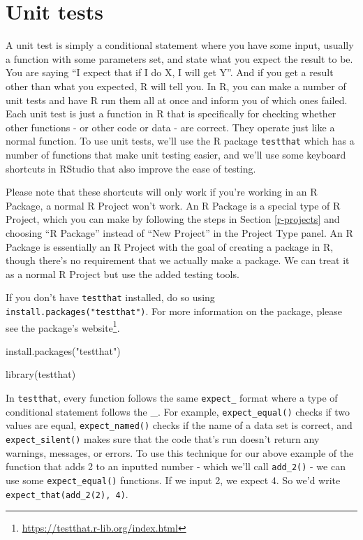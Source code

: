 \documentclass[
]{krantz}
\makeatletter
\newenvironment{Shaded}{\begin{snugshade}}{\end{snugshade}}
\newcommand{\FunctionTok}[1]{\textcolor[rgb]{0,0,0}{#1}}
\newcommand{\NormalTok}[1]{#1}
\newcommand{\StringTok}[1]{\textcolor[rgb]{0.5,0.5,0.5}{#1}}
\renewcommand{\href}[2]{#2\footnote{\url{#1}}}
\newenvironment{kframe}{%
\medskip{}
\setlength{\fboxsep}{.8em}
 \def\at@end@of@kframe{}%
 \ifinner\ifhmode%
  \def\at@end@of@kframe{\end{minipage}}%
  \begin{minipage}{\columnwidth}%
 \fi\fi%
 \def\FrameCommand##1{\hskip\@totalleftmargin \hskip-\fboxsep
 \colorbox{shadecolor}{##1}\hskip-\fboxsep
     \hskip-\linewidth \hskip-\@totalleftmargin \hskip\columnwidth}%
 \MakeFramed {\advance\hsize-\width
   \@totalleftmargin\z@ \linewidth\hsize
   \@setminipage}}%
 {\par\unskip\endMakeFramed%
 \at@end@of@kframe}
\renewenvironment{Shaded}{\begin{kframe}}{\end{kframe}}
\makeatother
\begin{document}
\hypertarget{unit-tests}{%
\section{Unit tests}\label{unit-tests}}

A unit test is simply a conditional statement where you have
some input, usually a function with some parameters set, and
state what you expect the result to be. You are saying ``I
expect that if I do X, I will get Y''. And if you get a
result other than what you expected, R will tell you. In R,
you can make a number of unit tests and have R run them all
at once and inform you of which ones failed. Each unit test
is just a function in R that is specifically for checking
whether other functions - or other code or data - are
correct. They operate just like a normal function. To use
unit tests, we'll use the R package \texttt{testthat} which
has a number of functions that make unit testing easier, and
we'll use some keyboard shortcuts in RStudio that also
improve the ease of testing.

Please note that these shortcuts will only work if you're
working in an R Package, a normal R Project won't work. An R
Package is a special type of R Project, which you can make
by following the steps in Section \ref{r-projects} and
choosing ``R Package'' instead of ``New Project'' in the
Project Type panel. An R Package is essentially an R Project
with the goal of creating a package in R, though there's no
requirement that we actually make a package. We can treat it
as a normal R Project but use the added testing tools.

If you don't have \texttt{testthat} installed, do so using
\texttt{install.packages("testthat")}. For more information
on the package, please see the package's
\href{https://testthat.r-lib.org/index.html}{website}.

\begin{Shaded}
\begin{Highlighting}[]
\FunctionTok{install.packages}\NormalTok{(}\StringTok{"testthat"}\NormalTok{)}
\end{Highlighting}
\end{Shaded}

\begin{Shaded}
\begin{Highlighting}[]
\FunctionTok{library}\NormalTok{(testthat)}
\end{Highlighting}
\end{Shaded}

In \texttt{testthat}, every function follows the same
\texttt{expect\_} format where a type of conditional
statement follows the \_. For example,
\texttt{expect\_equal()} checks if two values are equal,
\texttt{expect\_named()} checks if the name of a data set is
correct, and \texttt{expect\_silent()} makes sure that the
code that's run doesn't return any warnings, messages, or
errors. To use this technique for our above example of the
function that adds 2 to an inputted number - which we'll
call \texttt{add\_2()} - we can use some
\texttt{expect\_equal()} functions. If we input 2, we expect
4. So we'd write \texttt{expect\_that(add\_2(2),\ 4)}.
\end{document}
